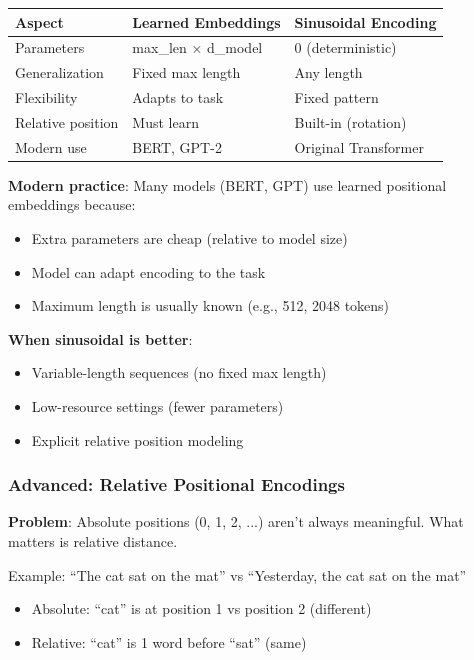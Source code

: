 \documentclass[11pt,oneside]{book}
\begin{document}
\begin{center}
\begin{tabular}{lll}
\hline
\textbf{Aspect} & \textbf{Learned Embeddings} & \textbf{Sinusoidal Encoding} \\
\hline
Parameters & max\_len $\times$ d\_model & 0 (deterministic) \\
Generalization & Fixed max length & Any length \\
Flexibility & Adapts to task & Fixed pattern \\
Relative position & Must learn & Built-in (rotation) \\
Modern use & BERT, GPT-2 & Original Transformer \\
\hline
\end{tabular}
\end{center}

\textbf{Modern practice}: Many models (BERT, GPT) use learned positional embeddings because:
\begin{itemize}
\item Extra parameters are cheap (relative to model size)
\item Model can adapt encoding to the task
\item Maximum length is usually known (e.g., 512, 2048 tokens)
\end{itemize}

\textbf{When sinusoidal is better}:
\begin{itemize}
\item Variable-length sequences (no fixed max length)
\item Low-resource settings (fewer parameters)
\item Explicit relative position modeling
\end{itemize}

\subsubsection{Advanced: Relative Positional Encodings}

\textbf{Problem}: Absolute positions (0, 1, 2, ...) aren't always meaningful. What matters is relative distance.

Example: ``The cat sat on the mat'' vs ``Yesterday, the cat sat on the mat''
\begin{itemize}
\item Absolute: ``cat'' is at position 1 vs position 2 (different)
\item Relative: ``cat'' is 1 word before ``sat'' (same)
\end{itemize}
\end{document}
